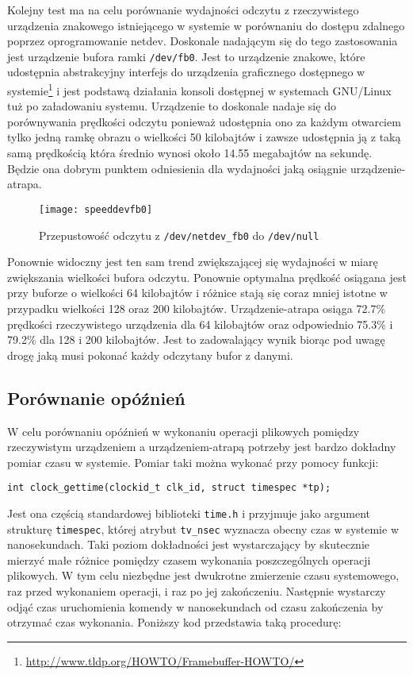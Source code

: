\documentclass[10pt]{scrartcl}
\begin{document}
Kolejny test ma na celu porównanie wydajności odczytu z rzeczywistego urządzenia znakowego istniejącego w systemie w porównaniu do dostępu zdalnego poprzez oprogramowanie netdev. Doskonale nadającym się do tego zastosowania jest urządzenie bufora ramki \texttt{/dev/fb0}. Jest to urządzenie znakowe, które udostępnia abstrakcyjny interfejs do urządzenia graficznego dostępnego w systemie\footnote{\url{http://www.tldp.org/HOWTO/Framebuffer-HOWTO/}} i jest podstawą działania konsoli dostępnej w systemach GNU/Linux tuż po załadowaniu systemu. Urządzenie to doskonale nadaje się do porównywania prędkości odczytu ponieważ udostępnia ono za każdym otwarciem tylko jedną ramkę obrazu o wielkości 50 kilobajtów i zawsze udostępnia ją z taką samą prędkością która średnio wynosi około 14.55 megabajtów na sekundę. Będzie ona dobrym punktem odniesienia dla wydajności jaką osiągnie urządzenie-atrapa.

\begin{figure}[H]
    \caption{Przepustowość odczytu z \texttt{/dev/netdev\_fb0} do \texttt{/dev/null}}
    \texttt{[image: speeddevfb0]}
\end{figure}

Ponownie widoczny jest ten sam trend zwiększającej się wydajności w miarę zwiększania wielkości bufora odczytu. Ponownie optymalna prędkość osiągana jest przy buforze o wielkości 64 kilobajtów i różnice stają się coraz mniej istotne w przypadku wielkości 128 oraz 200 kilobajtów. Urządzenie-atrapa osiąga 72.7\% prędkości rzeczywistego urządzenia dla 64 kilobajtów oraz odpowiednio 75.3\% i 79.2\% dla 128 i 200 kilobajtów. Jest to zadowalający wynik biorąc pod uwagę drogę jaką musi pokonać każdy odczytany bufor z danymi.

\subsection{Porównanie opóźnień}

W celu porównaniu opóźnień w wykonaniu operacji plikowych pomiędzy rzeczywistym urządzeniem a urządzeniem-atrapą potrzeby jest bardzo dokładny pomiar czasu w systemie. Pomiar taki można wykonać przy pomocy funkcji:

\begin{verbatim}
int clock_gettime(clockid_t clk_id, struct timespec *tp);
\end{verbatim}

Jest ona częścią standardowej biblioteki \texttt{time.h} i przyjmuje jako argument strukturę \texttt{timespec}, której atrybut \texttt{tv\_nsec} wyznacza obecny czas w systemie w nanosekundach. Taki poziom dokładności jest wystarczający by skutecznie mierzyć małe różnice pomiędzy czasem wykonania poszczególnych operacji plikowych. W tym celu niezbędne jest dwukrotne zmierzenie czasu systemowego, raz przed wykonaniem operacji, i raz po jej zakończeniu. Następnie wystarczy odjąć czas uruchomienia komendy w nanosekundach od czasu zakończenia by otrzymać czas wykonania. Poniższy kod przedstawia taką procedurę:
\end{document}
